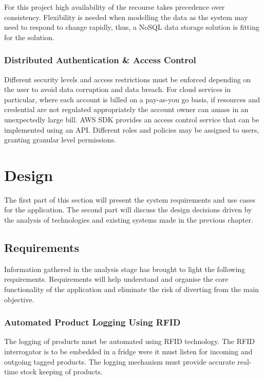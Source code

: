 \documentclass[a4paper, 11pt]{article}
\begin{document}
For this project high availability of the recourse takes precedence over consistency. Flexibility is needed when modelling the data as the system may need to respond to change rapidly, thus, a NoSQL data storage solution is fitting for the solution. 

\subsubsection{Distributed Authentication \& Access Control}
Different security levels and access restrictions must be enforced depending on the user to avoid data corruption and data breach. For cloud services in particular, where each account is billed on a pay-as-you go basis, if resources and credential are not regulated appropriately the account owner can amass in an unexpectedly large bill. AWS SDK provides an access control service that can be implemented using an API. Different roles and policies may be assigned to users, granting granular level permissions. 

\clearpage

\section{Design}
The first part of this section will present the system requirements and use cases for the application. The second part will discuss the design decisions driven by the analysis of technologies and existing systems made in the previous chapter.

\subsection{Requirements}
Information gathered in the analysis stage has brought to light the following requirements. Requirements will help understand and organise the core functionality of the application and eliminate the risk of diverting from the main objective.

\subsubsection{Automated Product Logging Using RFID}
The logging of products must be automated using RFID technology. The RFID interrogator is to be embedded in a fridge were it must listen for incoming and outgoing tagged products. The logging mechanism must provide accurate real-time stock keeping of products.
 
\end{document}
